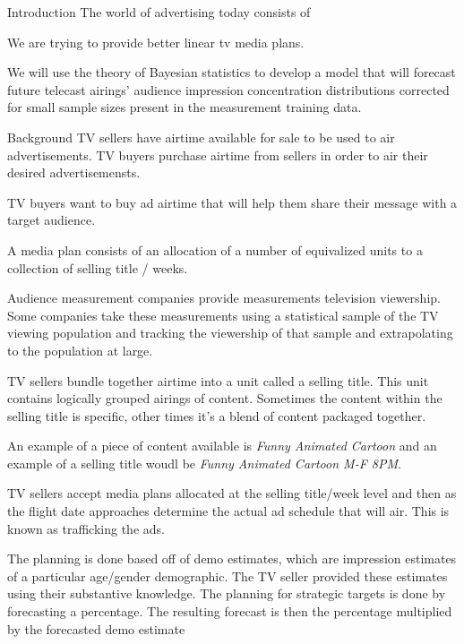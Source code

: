 \begin{chapter}{Introduction}\label{introduction}
  The world of advertising today consists of

  We are trying to provide better linear tv media plans.

  We will use the theory of Bayesian statistics to develop a model that
  will forecast future telecast airings' audience impression concentration
  distributions corrected for small sample sizes present in the measurement
  training data.

\begin{section}{Background}
  TV sellers have airtime available for sale to be used to air advertisements.
  TV buyers purchase airtime from sellers in order to air their desired advertisemensts.

  TV buyers want to buy ad airtime that will help them share their message
  with a target audience.

  A media plan consists of an allocation of a number of equivalized units to
  a collection of selling title / weeks.

  Audience measurement companies provide measurements television viewership.
  Some companies take these measurements using a statistical sample of the
  TV viewing population and tracking the viewership of that sample and extrapolating
  to the population at large.

  TV sellers bundle together airtime into a unit called a selling title.
  This unit contains logically grouped airings of content. Sometimes the content
  within the selling title is specific, other times it's a blend of content packaged together.

  An example of a piece of content available is \textit{Funny Animated Cartoon}
  and an example of a selling title woudl be \textit{Funny Animated Cartoon M-F 8PM}.

  TV sellers accept media plans allocated at the selling title/week level and then
  as the flight date approaches determine the actual ad schedule that will air.
  This is known as trafficking the ads.

  The planning is done based off of demo estimates, which are impression estimates of
  a particular age/gender demographic. The TV seller provided these estimates
  using their substantive knowledge. The planning for strategic targets is
  done by forecasting a percentage. The resulting forecast is then the percentage multiplied by the forecasted
  demo estimate

\end{section}


\end{chapter}
